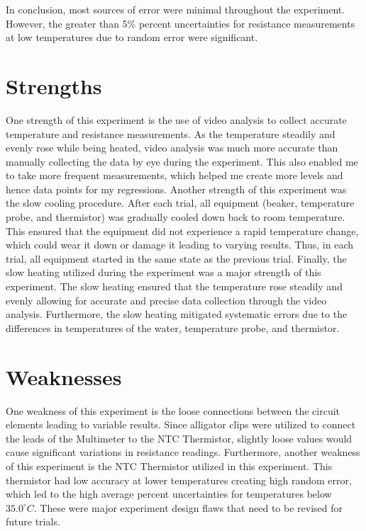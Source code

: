 In conclusion, most sources of error were minimal throughout the experiment. However, the greater than 5\% percent uncertainties for resistance measurements at low temperatures due to random error were significant.

\section{Strengths}
One strength of this experiment is the use of video analysis to collect accurate temperature and resistance measurements. As the temperature steadily and evenly rose while being heated, video analysis was much more accurate than manually collecting the data by eye during the experiment. This also enabled me to take more frequent measurements, which helped me create more levels and hence data points for my regressions. Another strength of this experiment was the slow cooling procedure. After each trial, all equipment (beaker, temperature probe, and thermistor) was gradually cooled down back to room temperature. This ensured that the equipment did not experience a rapid temperature change, which could wear it down or damage it leading to varying results. Thus, in each trial, all equipment started in the same state as the previous trial. Finally, the slow heating utilized during the experiment was a major strength of this experiment. The slow heating ensured that the temperature rose steadily and evenly allowing for accurate and precise data collection through the video analysis. Furthermore, the slow heating mitigated systematic errors due to the differences in temperatures of the water, temperature probe, and thermistor.

\section{Weaknesses}
One weakness of this experiment is the loose connections between the circuit elements leading to variable results. Since alligator clips were utilized to connect the leads of the Multimeter to the NTC Thermistor, slightly loose values would cause significant variations in resistance readings. Furthermore, another weakness of this experiment is the NTC Thermistor utilized in this experiment. This thermistor had low accuracy at lower temperatures creating high random error, which led to the high average percent uncertainties for temperatures below $35.0^\circ C$. These were major experiment design flaws that need to be revised for future trials.


